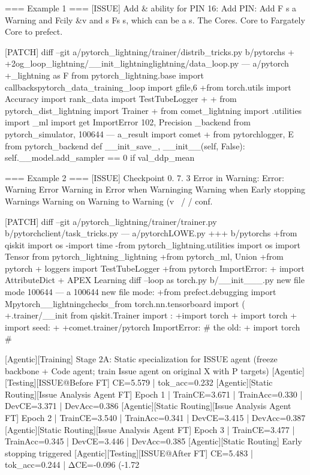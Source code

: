  === Example 1 ===
 [ISSUE]
 Add & ability for PIN 16: Add PIN: Add F s a Warning and Fcily &v and s Fs s, which can be a s. The Cores. Core to Fargately Core to prefect.
 
 [PATCH]
 diff --git a/pytorch_lightning/trainer/distrib_tricks.py b/pytorchs + +2og_loop_lightning/__init_lightninglightning/data_loop.py --- a/pytorch +_lightning as F from pytorch_lightning.base import callbackspytorch_data_training_loop import gfile,6 +from torch.utils import Accuracy import rank_data import TestTubeLogger + + from pytorch_dist_lightning import Trainer + from comet_lightning import .utilities import _ml import get ImportError 102, Precision _backend from pytorch_simulator, 100644 --- a_result import comet + from pytorchlogger, E from pytorch_backend def __init_save_, __init__(self, False): self.__model.add_sampler == 0 if val_ddp_mean
 
 === Example 2 ===
 [ISSUE]
 Checkpoint 0. 7. 3 Error in Warning: Error: Warning Error Warning in Error when Warninging Warning when Early stopping Warnings Warning on Warning to Warning (v ~/ / conf.
 
 [PATCH]
 diff --git a/pytorch_lightning/trainer/trainer.py b/pytorchclient/task_tricks.py --- a/pytorchLOWE.py +++ b/pytorchs +from qiskit import os -import time -from pytorch_lightning.utilities import os import Tensor from pytorch_lightning_lightning +from pytorch_ml, Union +from pytorch + loggers import TestTubeLogger +from pytorch ImportError: + import AttributeDict + APEX Learning diff --loop as torch.py b/__init___.py new file mode 100644 --- a 100644 new file mode: +from prefect.debugging import Mpytorch__lightningchecks_from torch.nn.tensorboard import ( +.trainer/__init from qiskit.Trainer import : +import torch + import torch + import seed: + +comet.trainer/pytorch ImportError: # the old: + import torch #
 
 [Agentic][Training] Stage 2A: Static specialization for ISSUE agent (freeze backbone + Code agent; train Issue agent on original X with P targets)
 [Agentic][Testing][ISSUE@Before FT] CE=5.579 | tok_acc=0.232
 [Agentic][Static Routing][Issue Analysis Agent FT] Epoch 1 | TrainCE=3.671 | TrainAcc=0.330 | DevCE=3.371 | DevAcc=0.386
 [Agentic][Static Routing][Issue Analysis Agent FT] Epoch 2 | TrainCE=3.540 | TrainAcc=0.341 | DevCE=3.415 | DevAcc=0.387
 [Agentic][Static Routing][Issue Analysis Agent FT] Epoch 3 | TrainCE=3.477 | TrainAcc=0.345 | DevCE=3.446 | DevAcc=0.385
 [Agentic][Static Routing] Early stopping triggered
 [Agentic][Testing][ISSUE@After FT] CE=5.483 | tok_acc=0.244 | ΔCE=-0.096 (-1.72%
 
